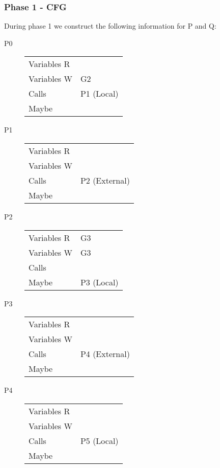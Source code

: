 \documentclass{article}
\begin{document}
\pagebreak
\subsubsection{Phase 1 - CFG}
During phase 1 we construct the following information for P and Q:

\begin{multicols}{2}

\begin{description}
\item[P0]
  \begin{tabular}{ll}
    Variables R & \\
    Variables W & G2 \\
    Calls       & P1 (Local) \\
    Maybe       & \\
  \end{tabular}

\item[P1]
  \begin{tabular}{ll}
    Variables R & \\
    Variables W & \\
    Calls       & P2 (External) \\
    Maybe       & \\
  \end{tabular}

\item[P2]
  \begin{tabular}{ll}
    Variables R & G3 \\
    Variables W & G3 \\
    Calls       & \\
    Maybe       & P3 (Local) \\
  \end{tabular}

\item[P3]
  \begin{tabular}{ll}
    Variables R & \\
    Variables W & \\
    Calls       & P4 (External) \\
    Maybe       & \\
  \end{tabular}

\item[P4]
  \begin{tabular}{ll}
    Variables R & \\
    Variables W & \\
    Calls       & P5 (Local) \\
    Maybe       & \\
  \end{tabular}


\end{description}
\end{multicols}
\end{document}
